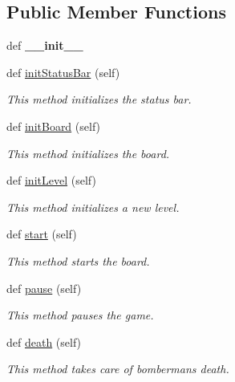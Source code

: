 \subsection*{Public Member Functions}
\begin{DoxyCompactItemize}
\item 
\hypertarget{classsrc_1_1board_1_1_board_ae8571472bb4178812dd941cf3f8e5f7c}{}def {\bfseries \+\_\+\+\_\+init\+\_\+\+\_\+}\label{classsrc_1_1board_1_1_board_ae8571472bb4178812dd941cf3f8e5f7c}

\item 
def \hyperlink{classsrc_1_1board_1_1_board_a9088e838b9bb196505af60eb1598495c}{init\+Status\+Bar} (self)
\begin{DoxyCompactList}\small\item\em This method initializes the status bar. \end{DoxyCompactList}\item 
def \hyperlink{classsrc_1_1board_1_1_board_a3ea0ac2d9356f9ebe6a63176b2351b5b}{init\+Board} (self)
\begin{DoxyCompactList}\small\item\em This method initializes the board. \end{DoxyCompactList}\item 
def \hyperlink{classsrc_1_1board_1_1_board_a2b87c8bc2da1173e07467996e4facbc4}{init\+Level} (self)
\begin{DoxyCompactList}\small\item\em This method initializes a new level. \end{DoxyCompactList}\item 
def \hyperlink{classsrc_1_1board_1_1_board_a97be76e6fb7312dddd9c86290fc3a1db}{start} (self)
\begin{DoxyCompactList}\small\item\em This method starts the board. \end{DoxyCompactList}\item 
def \hyperlink{classsrc_1_1board_1_1_board_a29473ffbf635f04428be1349d177eedc}{pause} (self)
\begin{DoxyCompactList}\small\item\em This method pauses the game. \end{DoxyCompactList}\item 
def \hyperlink{classsrc_1_1board_1_1_board_a68ece335899ccecebb6ecb39c339d180}{death} (self)
\begin{DoxyCompactList}\small\item\em This method takes care of bomberman\textquotesingle{}s death. \end{DoxyCompactList}\item 

\end{DoxyCompactItemize}
